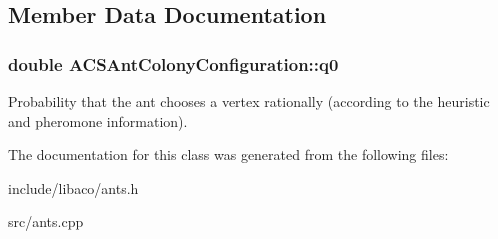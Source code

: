 \subsection{Member Data Documentation}
\hypertarget{classACSAntColonyConfiguration_237f5ebe10da6ad5b037f207ae9ed939}{
\subsubsection[q0]{\setlength{\rightskip}{0pt plus 5cm}double {\bf ACSAntColonyConfiguration::q0}}}
\label{classACSAntColonyConfiguration_237f5ebe10da6ad5b037f207ae9ed939}


Probability that the ant chooses a vertex rationally (according to the heuristic and pheromone information). 



The documentation for this class was generated from the following files:\begin{CompactItemize}
\item 
include/libaco/ants.h\item 
src/ants.cpp\end{CompactItemize}
